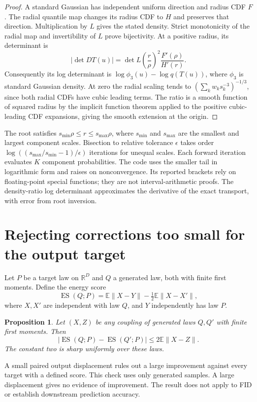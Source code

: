 \documentclass[11pt]{article}
\newtheorem{proposition}{Proposition}
\newcommand{\E}{\mathbb E}
\newcommand{\R}{\mathbb R}
\begin{document}
\begin{proof}
A standard Gaussian has independent uniform direction and radius CDF $F$. The radial quantile map changes its radius CDF to $H$ and preserves that direction. Multiplication by $L$ gives the stated density. Strict monotonicity of the radial map and invertibility of $L$ prove bijectivity. At a positive radius, its determinant is
\begin{equation}
 |\det DT(u)|=\det L\left(\frac r\rho\right)^2\frac{F'(\rho)}{H'(r)}.
\end{equation}
Consequently its log determinant is $\log\phi_3(u)-\log q(T(u))$, where $\phi_3$ is standard Gaussian density. At zero the radial scaling tends to $(\sum_k w_ks_k^{-3})^{-1/3}$, since both radial CDFs have cubic leading terms. The ratio is a smooth function of squared radius by the implicit function theorem applied to the positive cubic-leading CDF expansions, giving the smooth extension at the origin.
\end{proof}
The root satisfies $s_{\min}\rho\leq r\leq s_{\max}\rho$, where $s_{\min}$ and $s_{\max}$ are the smallest and largest component scales. Bisection to relative tolerance $\epsilon$ takes order $\log((s_{\max}/s_{\min}-1)/\epsilon)$ iterations for unequal scales. Each forward iteration evaluates $K$ component probabilities. The code uses the smaller tail in logarithmic form and raises on nonconvergence. Its reported brackets rely on floating-point special functions; they are not interval-arithmetic proofs. The density-ratio log determinant approximates the derivative of the exact transport, with error from root inversion.

\section{Rejecting corrections too small for the output target}
Let $P$ be a target law on $\R^D$ and $Q$ a generated law, both with finite first moments. Define the energy score
\begin{equation}
 \operatorname{ES}(Q;P)=\E\|X-Y\|-\tfrac12\E\|X-X'\|,
\end{equation}
where $X,X'$ are independent with law $Q$, and $Y$ independently has law $P$.

\begin{proposition}
Let $(X,Z)$ be any coupling of generated laws $Q,Q'$ with finite first moments. Then
\begin{equation}
 |\operatorname{ES}(Q;P)-\operatorname{ES}(Q';P)|\leq2\E\|X-Z\|.
\end{equation}
The constant two is sharp uniformly over these laws.
\end{proposition}
A small paired output displacement rules out a large improvement against every target with a defined score. This check uses only generated samples. A large displacement gives no evidence of improvement. The result does not apply to FID or establish downstream prediction accuracy.
\end{document}
